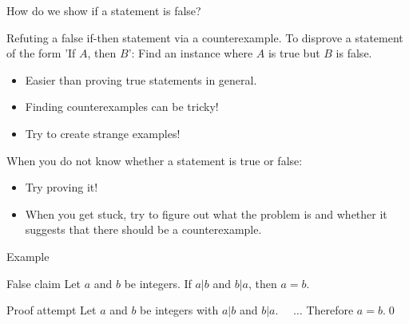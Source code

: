 \documentclass{beamer}
\begin{document}
\begin{frame}{How do we show if a statement is false?}
\begin{block}{Refuting a false if-then statement via a counterexample.}
To disprove a statement of the form 'If $A$, then $B$': Find an instance where $A$ is true but $B$ is false.
\end{block}\pause

\begin{itemize}
\item Easier than proving true statements in general.\pause
\item Finding counterexamples can be tricky!\pause
\item Try to create strange examples!
\end{itemize}

When you do not know whether a statement is true or false:
\begin{itemize}
\item Try proving it!\pause
\item When you get stuck, try to figure out what the problem is and whether it suggests that there should be a counterexample.
\end{itemize}
\end{frame}

\begin{frame}{Example}
\begin{block}{False claim}
Let $a$ and $b$ be integers. If $a|b$ and $b|a$, then $a=b$.
\end{block}

\begin{block}{Proof attempt}
Let $a$ and $b$ be integers with $a|b$ and $b|a$. ~~\color{black}$\dots$ Therefore $a=b$.\qed
\end{block}


\end{frame}
\end{document}
